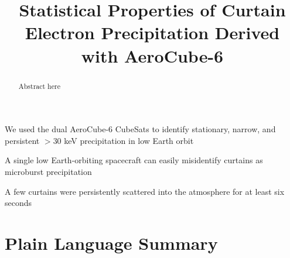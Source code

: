 \documentclass[draft]{agujournal2019}
\begin{document}
\title{Statistical Properties of Curtain Electron Precipitation Derived with AeroCube-6}

%
%





\begin{keypoints}
\item We used the dual AeroCube-6 CubeSats to identify stationary, narrow, and persistent $>30$ keV precipitation in low Earth orbit
\item A single low Earth-orbiting spacecraft can easily misidentify curtains as microburst precipitation
\item A few curtains were persistently scattered into the atmosphere for at least six seconds
\end{keypoints}


\begin{abstract}
Abstract here
\end{abstract}

\section{Plain Language Summary}
\end{document}
